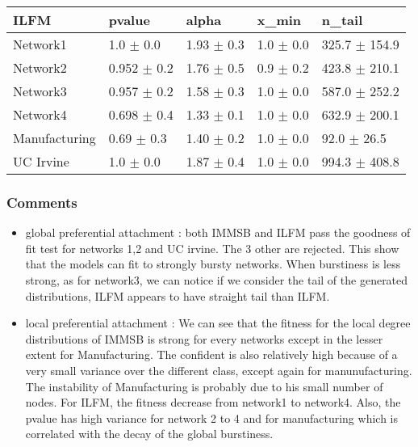 \documentclass[a4paper, 12pt]{article}
\begin{document}
\begin{table}
    \begin{tabular}{lllll}
    \hline
        \textbf{ILFM} & pvalue          & alpha           & x\_min           & n\_tail              \\
    \hline
    Network1     & 1.0 $\pm$ 0.0     & 1.93 $\pm$ 0.3  & 1.0 $\pm$ 0.0     & 325.7 $\pm$ 154.9 \\
    Network2     & 0.952 $\pm$ 0.2 & 1.76 $\pm$ 0.5 & 0.9 $\pm$ 0.2 & 423.8 $\pm$ 210.1  \\
    Network3     & 0.957 $\pm$ 0.2 & 1.58 $\pm$ 0.3 & 1.0 $\pm$ 0.0     & 587.0 $\pm$ 252.2 \\
    Network4     & 0.698 $\pm$ 0.4 & 1.33 $\pm$ 0.1 & 1.0 $\pm$ 0.0     & 632.9 $\pm$ 200.1  \\
    Manufacturing & 0.69 $\pm$ 0.3   & 1.40 $\pm$ 0.2 & 1.0 $\pm$ 0.0     & 92.0 $\pm$ 26.5     \\
    UC Irvine     & 1.0 $\pm$ 0.0     & 1.87 $\pm$ 0.4   & 1.0 $\pm$ 0.0     & 994.3 $\pm$ 408.8 \\
    \hline
    \end{tabular}
\label{table:local_gof}
\end{table}

\subsubsection{Comments}

\begin{itemize}
    \item global preferential attachment : both IMMSB and ILFM pass the goodness of fit test for networks 1,2 and UC irvine. The 3 other are rejected. This show that the models can fit to strongly bursty networks. When burstiness is less strong, as for network3, we can notice if we consider the tail of the generated distributions, ILFM appears to have straight tail than ILFM.
    \item local preferential attachment : We can see that the fitness for the local degree distributions of IMMSB is strong for every networks except in the lesser extent for Manufacturing. The confident is also relatively high because of a very small variance over the different class, except again for manunufacturing. The instability of Manufacturing is probably due to his small number of nodes. For ILFM, the fitness decrease from network1 to network4. Also, the pvalue has high variance for network 2 to 4 and for manufacturing which is correlated with the decay of the global burstiness.
\end{itemize}
\end{document}
